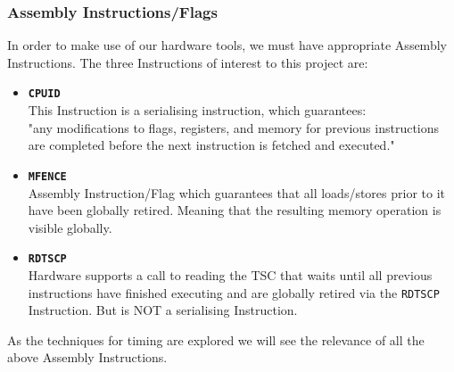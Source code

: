 \documentclass[bsc,frontabs,twoside,singlespacing,parskip,deptreport]{infthesis}     %
\begin{document}
{\subsubsection{Assembly Instructions/Flags}
{
In order to make use of our hardware tools, we must have appropriate Assembly Instructions. The three Instructions of interest to this project are:
\begin{itemize}
    \item{
        {\bf \texttt{CPUID}\cite{cpuid_spec}} \\
        This Instruction is a serialising instruction, which guarantees: \\
        "any modifications to flags, registers, and memory for previous instructions are completed before the next instruction is fetched and executed."
    }
    \item{
        {\bf \texttt{MFENCE}\cite{mfence_spec}} \\
        Assembly Instruction/Flag which guarantees that all loads/stores prior to it have been globally retired. Meaning that the resulting memory operation is visible globally.
    }
    \item{{\bf \texttt{RDTSCP}\cite{rdtscp_spec}} \\
    Hardware supports a call to reading the TSC that waits until all previous instructions have finished executing and are globally retired via the \texttt{RDTSCP} Instruction. But is NOT a serialising Instruction.}
\end{itemize}
As the techniques for timing are explored we will see the relevance of all the above Assembly Instructions.
}

}
\end{document}
